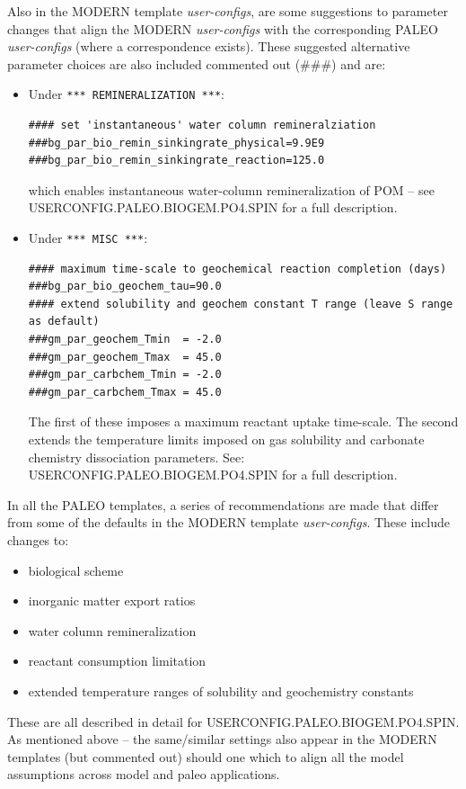 Also in the MODERN template \textit{user-configs}, are some suggestions to parameter changes that align the MODERN \textit{user-configs} with the corresponding PALEO \textit{user-configs} (where a correspondence exists). These suggested alternative parameter choices are also included commented out (\#\#\#) and are:

\begin{itemize}[leftmargin=0.6in]
\vspace{1mm}
\item[--] Under \texttt{*** REMINERALIZATION ***}:
\small\vspace{-1mm}\begin{verbatim}
#### set 'instantaneous' water column remineralziation
###bg_par_bio_remin_sinkingrate_physical=9.9E9
###bg_par_bio_remin_sinkingrate_reaction=125.0
\end{verbatim}\vspace{-1mm}\normalsize
which enables instantaneous water-column remineralization of POM -- see \linebreak \textsf{\footnotesize USERCONFIG.PALEO.BIOGEM.PO4.SPIN} for a full description.
\vspace{1mm}
\item[--] Under \texttt{*** MISC ***}:
\small\vspace{-1mm}\begin{verbatim}
#### maximum time-scale to geochemical reaction completion (days)
###bg_par_bio_geochem_tau=90.0
#### extend solubility and geochem constant T range (leave S range as default)
###gm_par_geochem_Tmin  = -2.0
###gm_par_geochem_Tmax  = 45.0
###gm_par_carbchem_Tmin = -2.0
###gm_par_carbchem_Tmax = 45.0
\end{verbatim}\vspace{-1mm}\normalsize
The first of these imposes a maximum reactant uptake time-scale. The second extends the temperature limits imposed on gas solubility and carbonate chemistry dissociation parameters. See: \textsf{\footnotesize USERCONFIG.PALEO.BIOGEM.PO4.SPIN} for a full description.
\end{itemize}

\vspace{1mm}
In  all the PALEO templates, a series of recommendations are made that differ from some of the defaults in the MODERN template \textit{user-configs}. These include changes to:
\begin{itemize}[leftmargin=0.6in]
\item[1.] biological scheme
\item[2.] inorganic matter export ratios
\item[3.] water column remineralization
\item[4.] reactant consumption limitation
\item[5.] extended temperature ranges of solubility and geochemistry constants
\end{itemize}
These are all described in detail for \textsf{\footnotesize USERCONFIG.PALEO.BIOGEM.PO4.SPIN}.
\\\noindent As mentioned above -- the same/similar settings also appear in the MODERN templates (but commented out) should one which to align all the model assumptions across model and paleo applications.

